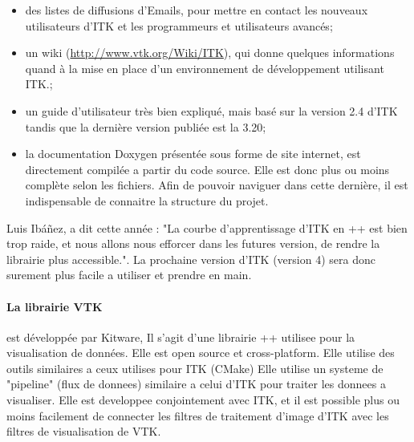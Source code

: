 \begin{itemize}
  \item des listes de diffusions d'Emails, pour mettre en contact les nouveaux utilisateurs d'ITK et les programmeurs et utilisateurs avancés;
  \item un wiki (\url{http://www.vtk.org/Wiki/ITK}), qui donne quelques informations quand à la mise en place d'un environnement de développement utilisant ITK.;
  \item un guide d'utilisateur\cite{ITKSoftwareGuide} très bien expliqué, mais basé sur la version 2.4 d'ITK tandis que la dernière version publiée est la 3.20;
  \item la documentation Doxygen présentée sous forme de site internet, est directement compilée a partir du code source. Elle est donc plus ou moins complète selon les fichiers. Afin de pouvoir naviguer dans cette dernière, il est indispensable de connaitre la structure du projet.
\end{itemize}
Luis Ibáñez, a dit cette année : "La courbe d'apprentissage d'ITK en \C++ est bien trop raide, et nous allons nous efforcer dans les futures version, de rendre la librairie plus accessible.". La prochaine version d'ITK (version 4) sera donc surement plus facile a utiliser et prendre en main.

\paragraph{La librairie VTK} est développée par Kitware, Il s'agit d'une librairie \C++ utilisee pour la visualisation de données. Elle est open source et cross-platform. Elle utilise des outils similaires a ceux utilises pour ITK (CMake)
Elle utilise un systeme de "pipeline" (flux de donnees) similaire a celui d'ITK pour traiter les donnees a visualiser. Elle est developpee conjointement avec ITK, et il est possible plus ou moins facilement de connecter les filtres de traitement d'image d'ITK avec les filtres de visualisation de VTK.

